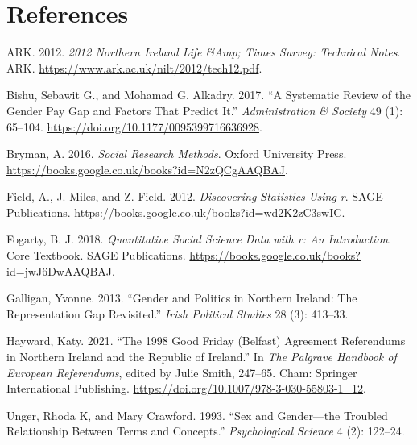 \documentclass[
]{article}
\newlength{\cslhangindent}
\newlength{\cslentryspacingunit} %
\newenvironment{CSLReferences}[2] %
 {%
  \setlength{\parindent}{0pt}
  \ifodd #1
  \let\oldpar\par
  \def\par{\hangindent=\cslhangindent\oldpar}
  \fi
  \setlength{\parskip}{#2\cslentryspacingunit}
 }%
 {}
\begin{document}
\pagebreak

\hypertarget{references}{%
\section{References}\label{references}}

\hypertarget{refs}{}
\begin{CSLReferences}{1}{0}
\leavevmode{}%
ARK. 2012. \emph{2012 Northern Ireland Life \&Amp; Times Survey:
Technical Notes}. ARK. \url{https://www.ark.ac.uk/nilt/2012/tech12.pdf}.

\leavevmode{}%
Bishu, Sebawit G., and Mohamad G. Alkadry. 2017. {``A Systematic Review
of the Gender Pay Gap and Factors That Predict It.''}
\emph{Administration \& Society} 49 (1): 65--104.
\url{https://doi.org/10.1177/0095399716636928}.

\leavevmode{}%
Bryman, A. 2016. \emph{Social Research Methods}. Oxford University
Press. \url{https://books.google.co.uk/books?id=N2zQCgAAQBAJ}.

\leavevmode{}%
Field, A., J. Miles, and Z. Field. 2012. \emph{Discovering Statistics
Using r}. SAGE Publications.
\url{https://books.google.co.uk/books?id=wd2K2zC3swIC}.

\leavevmode{}%
Fogarty, B. J. 2018. \emph{Quantitative Social Science Data with r: An
Introduction}. Core Textbook. SAGE Publications.
\url{https://books.google.co.uk/books?id=jwJ6DwAAQBAJ}.

\leavevmode{}%
Galligan, Yvonne. 2013. {``Gender and Politics in Northern Ireland: The
Representation Gap Revisited.''} \emph{Irish Political Studies} 28 (3):
413--33.

\leavevmode{}%
Hayward, Katy. 2021. {``The 1998 Good Friday (Belfast) Agreement
Referendums in Northern Ireland and the Republic of Ireland.''} In
\emph{The Palgrave Handbook of European Referendums}, edited by Julie
Smith, 247--65. Cham: Springer International Publishing.
\url{https://doi.org/10.1007/978-3-030-55803-1_12}.

\leavevmode{}%
Unger, Rhoda K, and Mary Crawford. 1993. {``Sex and Gender---the
Troubled Relationship Between Terms and Concepts.''} \emph{Psychological
Science} 4 (2): 122--24.

\end{CSLReferences}
\end{document}
